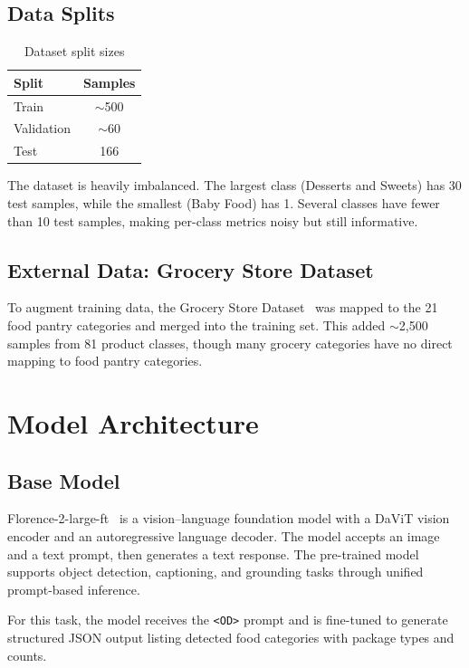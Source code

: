 \documentclass[11pt]{article}
\begin{document}
\subsection{Data Splits}

\begin{table}[h]
\centering
\caption{Dataset split sizes}
\begin{tabular}{lc}
\toprule
Split & Samples \\
\midrule
Train & $\sim$500 \\
Validation & $\sim$60 \\
Test & 166 \\
\bottomrule
\end{tabular}
\end{table}

The dataset is heavily imbalanced. The largest class (Desserts and Sweets) has 30 test samples, while the smallest (Baby Food) has 1. Several classes have fewer than 10 test samples, making per-class metrics noisy but still informative.

\subsection{External Data: Grocery Store Dataset}

To augment training data, the Grocery Store Dataset~\cite{klasson2019} was mapped to the 21 food pantry categories and merged into the training set. This added $\sim$2{,}500 samples from 81 product classes, though many grocery categories have no direct mapping to food pantry categories.

\section{Model Architecture}

\subsection{Base Model}

Florence-2-large-ft~\cite{xiao2023florence} is a vision--language foundation model with a DaViT vision encoder and an autoregressive language decoder. The model accepts an image and a text prompt, then generates a text response. The pre-trained model supports object detection, captioning, and grounding tasks through unified prompt-based inference.

For this task, the model receives the \texttt{<OD>} prompt and is fine-tuned to generate structured JSON output listing detected food categories with package types and counts.
\end{document}
